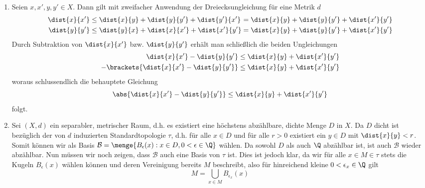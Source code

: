 \begin{exercisePage}
\begin{enumerate}[leftmargin=\zulength, label=(zu \alph*)]
	\item Seien $x,x',y,y' \in X$. Dann gilt mit zweifacher Anwendung der Dreiecksungleichung für eine Metrik $d$
	\begin{equation*}
		\begin{alignedat}{2}
		\dist{x}{x'} &\le \dist{x}{y}  + \dist{y}{y'} + \dist{y'}{x'} &&= \dist{x}{y} + \dist{y}{y'} + \dist{x'}{y'} \\
		\dist{y}{y'} &\le \dist{y}{x} + \dist{x}{x'} + \dist{x'}{y'} &&= \dist{x}{y} + \dist{y}{y'} + \dist{x'}{y'}
		\end{alignedat}
	\end{equation*}
	Durch Subtraktion von $\dist{x}{x'}$ bzw. $\dist{y}{y'}$ erhält man schließlich die beiden Ungleichungen
	\begin{equation*}
		\begin{alignedat}{2}
		\dist{x}{x'} -  \dist{y}{y'} &\le \dist{x}{y} + \dist{x'}{y'} \\
		- \brackets{\dist{x}{x'} - \dist{y}{y'}} &\le \dist{x}{y} + \dist{x'}{y'}
		\end{alignedat}
	\end{equation*}
	woraus schlussendlich die behauptete Gleichung
	\begin{equation*}
		\abs{\dist{x}{x'} - \dist{y}{y'}} \le \dist{x}{y} + \dist{x'}{y'}
	\end{equation*}
	folgt.
	
	\item Sei $(X,d)$ ein separabler, metrischer Raum, d.h. es existiert eine höchstens abzählbare, dichte Menge $D$ in $X$. Da $D$ dicht ist bezüglich der von $d$ induzierten Standardtopologie $\tau$, d.h. für alle $x \in D$ und für alle $r > 0$ existiert ein $y \in D$ mit $\dist{x}{y} < r$. Somit können wir als Basis $\mathcal{B} = \menge{B_\epsilon(x) : x \in D, 0 < \epsilon \in \Q}$ wählen.
	Da sowohl $D$ als auch $\Q$ abzählbar ist, ist auch $\mathcal{B}$ wieder abzählbar. Nun müssen wir noch zeigen, dass $\mathcal{B}$ auch eine Basis von $\tau$ ist. Dies ist jedoch klar, da wir für alle $x \in M \in \tau$ stets die Kugeln $B_\epsilon(x)$ wählen können und deren Vereinigung bereits $M$ beschreibt, also für hinreichend kleine $0 < \epsilon_x \in \Q$ gilt
	\begin{equation*}
		M = \bigcup_{x \in M} B_{\epsilon_x}(x)
	\end{equation*}
\end{enumerate}


\end{exercisePage}
